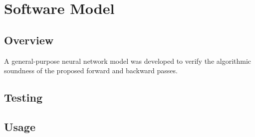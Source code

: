\chapter{Software Model}
\section{Overview}
A general-purpose neural network model was developed to verify the algorithmic soundness of the proposed forward and backward passes.
\section{Testing}
\section{Usage}